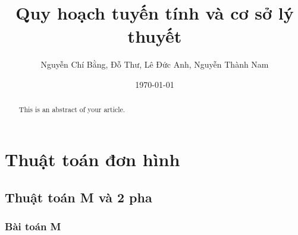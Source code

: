 \documentclass{article}
\title{Quy hoạch tuyến tính và cơ sở lý thuyết}
\author{Nguyễn Chí Bằng, Đỗ Thư, Lê Đức Anh, Nguyễn Thành Nam}
\date{\today}
\begin{document}
\maketitle

\begin{abstract}
This is an abstract of your article.
\end{abstract}

\tableofcontents

\section{Thuật toán đơn hình}
    \subsection{Thuật toán M và 2 pha}
            \subsubsection{Bài toán M}
\end{document}
